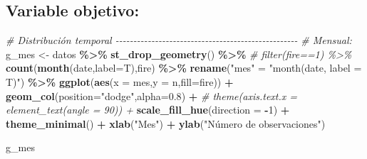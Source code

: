 \documentclass[12pt,a4paper,]{book}
\newenvironment{Shaded}{\begin{snugshade}}{\end{snugshade}}
\newcommand{\AttributeTok}[1]{\textcolor[rgb]{0.13,0.29,0.53}{#1}}
\newcommand{\CommentTok}[1]{\textcolor[rgb]{0.56,0.35,0.01}{\textit{#1}}}
\newcommand{\DecValTok}[1]{\textcolor[rgb]{0.00,0.00,0.81}{#1}}
\newcommand{\FloatTok}[1]{\textcolor[rgb]{0.00,0.00,0.81}{#1}}
\newcommand{\FunctionTok}[1]{\textcolor[rgb]{0.13,0.29,0.53}{\textbf{#1}}}
\newcommand{\NormalTok}[1]{#1}
\newcommand{\OtherTok}[1]{\textcolor[rgb]{0.56,0.35,0.01}{#1}}
\newcommand{\SpecialCharTok}[1]{\textcolor[rgb]{0.81,0.36,0.00}{\textbf{#1}}}
\newcommand{\StringTok}[1]{\textcolor[rgb]{0.31,0.60,0.02}{#1}}
\numberwithin{dummy}{section}
\theoremstyle{ocrenumbox}
\theoremstyle{blacknumex}
\theoremstyle{blacknumbox}
\theoremstyle{ocrenum}
\theoremstyle{ocrenum}
\begin{document}
\hypertarget{variable-objetivo}{%
\subsection{Variable objetivo:}\label{variable-objetivo}}

\begin{Shaded}
\begin{Highlighting}[]
\CommentTok{\# Distribución temporal {-}{-}{-}{-}{-}{-}{-}{-}{-}{-}{-}{-}{-}{-}{-}{-}{-}{-}{-}{-}{-}{-}{-}{-}{-}{-}{-}{-}{-}{-}{-}{-}{-}{-}{-}{-}{-}{-}{-}{-}{-}{-}{-}{-}{-}{-}{-}{-}{-}{-}{-}}
\CommentTok{\# Mensual:}
\NormalTok{g\_mes }\OtherTok{\textless{}{-}}\NormalTok{ datos }\SpecialCharTok{\%\textgreater{}\%} 
  \FunctionTok{st\_drop\_geometry}\NormalTok{() }\SpecialCharTok{\%\textgreater{}\%} 
  \CommentTok{\# filter(fire==1) \%\textgreater{}\% }
  \FunctionTok{count}\NormalTok{(}\FunctionTok{month}\NormalTok{(date,}\AttributeTok{label=}\NormalTok{T),fire) }\SpecialCharTok{\%\textgreater{}\%} 
  \FunctionTok{rename}\NormalTok{(}\StringTok{"mes"} \OtherTok{=} \StringTok{"month(date, label = T)"}\NormalTok{) }\SpecialCharTok{\%\textgreater{}\%} 
  \FunctionTok{ggplot}\NormalTok{(}\FunctionTok{aes}\NormalTok{(}\AttributeTok{x =}\NormalTok{ mes,}\AttributeTok{y =}\NormalTok{ n,}\AttributeTok{fill=}\NormalTok{fire)) }\SpecialCharTok{+}
  \FunctionTok{geom\_col}\NormalTok{(}\AttributeTok{position=}\StringTok{"dodge"}\NormalTok{,}\AttributeTok{alpha=}\FloatTok{0.8}\NormalTok{) }\SpecialCharTok{+}
  \CommentTok{\# theme(axis.text.x = element\_text(angle = 90)) +}
  \FunctionTok{scale\_fill\_hue}\NormalTok{(}\AttributeTok{direction =} \SpecialCharTok{{-}}\DecValTok{1}\NormalTok{) }\SpecialCharTok{+}
  \FunctionTok{theme\_minimal}\NormalTok{() }\SpecialCharTok{+}
  \FunctionTok{xlab}\NormalTok{(}\StringTok{"Mes"}\NormalTok{) }\SpecialCharTok{+}
  \FunctionTok{ylab}\NormalTok{(}\StringTok{"Número de observaciones"}\NormalTok{)}

\NormalTok{g\_mes}


\end{Highlighting}
\end{Shaded}
\end{document}
